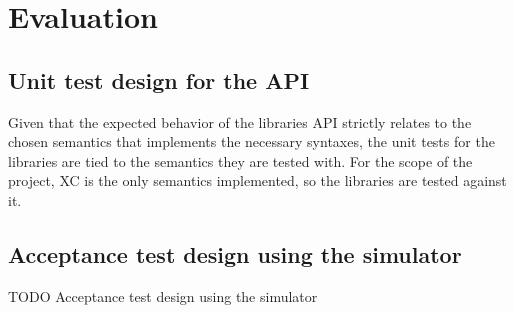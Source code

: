 \chapter{Evaluation}
\label{chap:evaluation}

\section{Unit test design for the API}

Given that the expected behavior of the libraries \ac{API} strictly relates to the chosen semantics that implements the necessary syntaxes, the unit tests for the libraries are tied to the semantics they are tested with.
%
For the scope of the project, \ac{XC} is the only semantics implemented, so the libraries are tested against it.
%

\section{Acceptance test design using the simulator}

TODO Acceptance test design using the simulator
